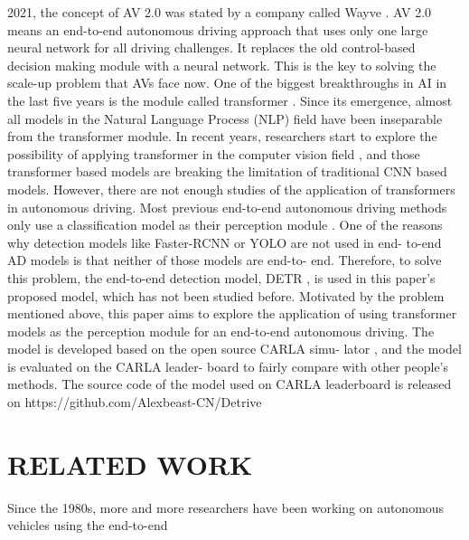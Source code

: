\documentclass[conference]{IEEEtran}
\begin{document}
2021, the concept of AV 2.0 was stated by a company called Wayve \cite{hawke2021reimagining}. AV 2.0 means an end-to-end autonomous driving approach that uses only one large neural network for all driving challenges. It replaces the old control-based decision making module with a neural network. This is the key to solving the scale-up problem that AVs face now.
One of the biggest breakthroughs in AI in the last five years is the module called transformer \cite{vaswani2017attention}. Since its emergence, almost all models in the Natural Language Process (NLP) field have been inseparable from the transformer module. In recent years, researchers start to explore the possibility of applying transformer in the computer vision field \cite{dosovitskiy2020image} \cite{liu2021swin} \cite{carion2020end} \cite{zhang2022dino}, and those transformer based models are breaking the limitation of traditional CNN based models. However, there are not enough studies of the application of transformers in autonomous driving.
Most previous end-to-end autonomous driving methods only use a classification model as their perception module \cite{codevilla2018end} \cite{chen2015deepdriving}
\cite{sauer2018conditional} \cite{chen2020learning} \cite{chitta2023transfuser} \cite{wu2022trajectory}. One of the reasons why detection models like Faster-RCNN \cite{ren2015faster} or YOLO \cite{redmon2016you} are not used in end- to-end AD models is that neither of those models are end-to- end. Therefore, to solve this problem, the end-to-end detection model, DETR \cite{carion2020end}, is used in this paper's proposed model, which has not been studied before.
Motivated by the problem mentioned above, this paper aims to explore the application of using transformer models as the perception module for an end-to-end autonomous driving. The model is developed based on the open source CARLA simu- lator \cite{dosovitskiy2017carla}, and the model is evaluated on the CARLA leader- board \cite{carla} to fairly compare with other people's methods. The source code of the model used on CARLA leaderboard is released on https://github.com/Alexbeast-CN/Detrive

\section{RELATED WORK}
Since the 1980s, more and more researchers have been working  on  autonomous  vehicles  using  the  end-to-end
\end{document}
